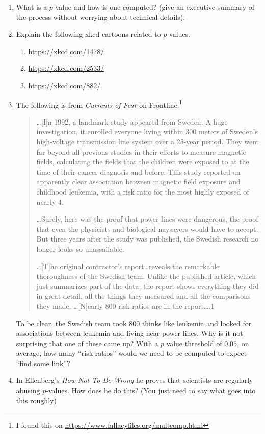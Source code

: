 \documentclass[11pt, letterpaper]{article}
\begin{document}
\begin{enumerate}
	\item What is a $p$-value and how is one computed? (give an executive summary of the process without worrying about technical details).
	\item Explain the following xkcd cartoons related to $p$-values.
	\begin{enumerate}
		\item \url{https://xkcd.com/1478/}
		\item \url{https://xkcd.com/2533/}
		\item \url{https://xkcd.com/882/}
	\end{enumerate}
	\item 
	The following is from \emph{Currents of Fear} on Frontline.\footnote{I found this on \url{https://www.fallacyfiles.org/multcomp.html}}
	\begin{quote}
		…[I]n 1992, a landmark study appeared from Sweden. A huge investigation, it enrolled everyone living within 300 meters of Sweden's high-voltage transmission line system over a 25-year period. They went far beyond all previous studies in their efforts to measure magnetic fields, calculating the fields that the children were exposed to at the time of their cancer diagnosis and before. This study reported an apparently clear association between magnetic field exposure and childhood leukemia, with a risk ratio for the most highly exposed of nearly 4.
		
		…Surely, here was the proof that power lines were dangerous, the proof that even the physicists and biological naysayers would have to accept. But three years after the study was published, the Swedish research no longer looks so unassailable. 
		
		…[T]he original contractor's report…reveals the remarkable thoroughness of the Swedish team. Unlike the published article, which just summarizes part of the data, the report shows everything they did in great detail, all the things they measured and all the comparisons they made. …[N]early 800 risk ratios are in the report….1
	\end{quote}
	To be clear, the Swedish team took 800 thinks like leukemia and looked for associations between leukemia and living near power lines. 
	Why is it not surprising that one of these came up?
	With a $p$ value threshold of $0.05$, on average, how many ``risk ratios'' would we need to be computed to expect ``find some link''?
	\item In Ellenberg's \emph{How Not To Be Wrong} he proves that scientists are regularly abusing $p$-values. How does he do this? (You just need to say what goes into this roughly)
\end{enumerate}
\end{document}
